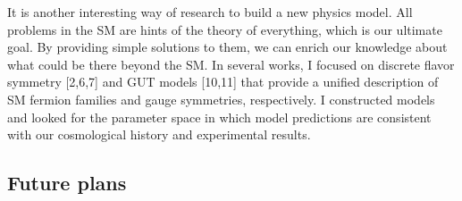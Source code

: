 \documentclass[12pt,notitlepage]{article}
\def\rem#1{ {\bf\textcolor{red}{($\clubsuit$ #1 $\clubsuit$)}}}
\begin{document}

It is another interesting way of research to build a new physics model.
All problems in the SM are hints of the theory of everything, which is our ultimate goal.
By providing simple solutions to them, we can enrich our knowledge about what could be there beyond the SM.
In several works, I focused on discrete flavor symmetry [2,6,7] and GUT models [10,11] that provide a unified description of SM fermion families and gauge symmetries, respectively.
I constructed models and looked for the parameter space in which model predictions are consistent with our cosmological history and experimental results.




\vspace*{-2mm}
\subsection*{Future plans}
\end{document}

